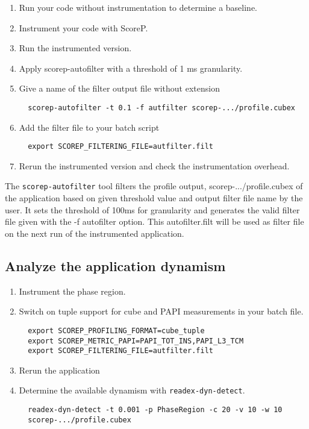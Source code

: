 \documentclass[12pt]{article}
\begin{document}
\begin{enumerate}
  \item Run your code without instrumentation to determine a baseline.
  \item Instrument your code with ScoreP.
  \item Run the instrumented version.
  \item Apply scorep-autofilter with a threshold of 1 ms granularity.
  \item Give a name of the filter output file without extension
  \begin{verbatim}
  scorep-autofilter -t 0.1 -f autfilter scorep-.../profile.cubex
  \end{verbatim}
  \item Add the filter file to your batch script
  \begin{verbatim}
  export SCOREP_FILTERING_FILE=autfilter.filt
  \end{verbatim}
  \item Rerun the instrumented version and check the instrumentation overhead.
\end{enumerate}
The \texttt{scorep-autofilter} tool filters the profile output, scorep-.../profile.cubex of the application based on given threshold value and output filter file name by the user. It sets the threshold of 100ms for granularity and generates the valid filter file given with the -f autofilter option. This autofilter.filt  will be used as filter file on the next run of the instrumented application.
\subsection{Analyze the application dynamism}

\begin{enumerate}
  \item Instrument the phase region.
  \item Switch on tuple support for cube and PAPI measurements in your batch file.
  \begin{verbatim}
  export SCOREP_PROFILING_FORMAT=cube_tuple
  export SCOREP_METRIC_PAPI=PAPI_TOT_INS,PAPI_L3_TCM
  export SCOREP_FILTERING_FILE=autfilter.filt
  \end{verbatim}
  \item Rerun the application
  \item Determine the available dynamism with {\tt readex-dyn-detect}.
  \begin{verbatim}
  readex-dyn-detect -t 0.001 -p PhaseRegion -c 20 -v 10 -w 10 
  scorep-.../profile.cubex
  \end{verbatim}
\end{enumerate}
\end{document}
